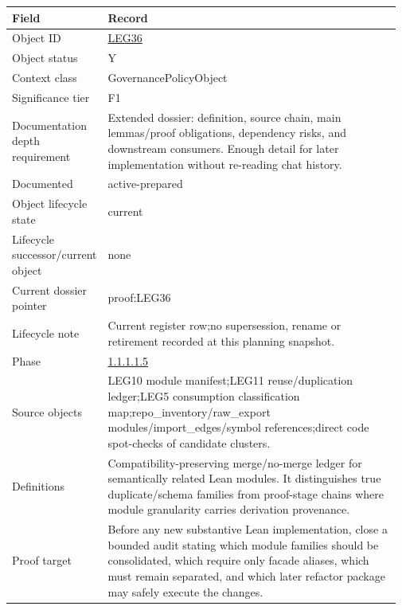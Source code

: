 \begin{longtable}{L{0.16\linewidth} L{0.81\linewidth}}
\hline
\textbf{Field} & \textbf{Record}\\
\hline
Object ID & \hyperlink{object-row-LEG36}{LEG36}\\
\hline\addlinespace[0.20em]
Object status & Y\\
\hline\addlinespace[0.20em]
Context class & GovernancePolicyObject\\
\hline\addlinespace[0.20em]
Significance tier & F1\\
\hline\addlinespace[0.20em]
Documentation depth requirement & Extended dossier: definition, source chain, main lemmas/\allowbreak{}proof obligations, dependency risks, and downstream consumers. Enough detail for later implementation without re-reading chat history.\\
\hline\addlinespace[0.20em]
Documented & active-prepared\\
\hline\addlinespace[0.20em]
Object lifecycle state & current\\
\hline\addlinespace[0.20em]
Lifecycle successor/\allowbreak{}current object & none\\
\hline\addlinespace[0.20em]
Current dossier pointer & proof:LEG36\\
\hline\addlinespace[0.20em]
Lifecycle note & Current register row;\newline no supersession, rename or retirement recorded at this planning snapshot.\\
\hline\addlinespace[0.20em]
Phase & \hyperlink{phase-row-1-1-1-1-5}{1.1.1.1.5}\\
\hline\addlinespace[0.20em]
Source objects & LEG10 module manifest;\newline LEG11 reuse/\allowbreak{}duplication ledger;\newline LEG5 consumption classification map;\newline repo\_inventory/\allowbreak{}raw\_export modules/\allowbreak{}import\_edges/\allowbreak{}symbol references;\newline direct code spot-checks of candidate clusters.\\
\hline\addlinespace[0.20em]
Definitions & Compatibility-preserving merge/\allowbreak{}no-merge ledger for semantically related Lean modules. It distinguishes true duplicate/\allowbreak{}schema families from proof-stage chains where module granularity carries derivation provenance.\\
\hline\addlinespace[0.20em]
Proof target & Before any new substantive Lean implementation, close a bounded audit stating which module families should be consolidated, which require only facade aliases, which must remain separated, and which later refactor package may safely execute the changes.\\

\end{longtable}
